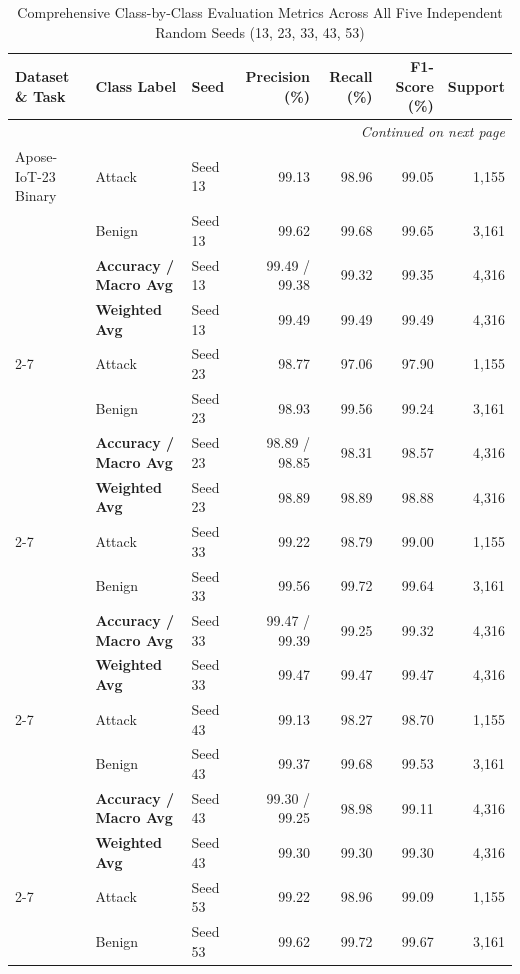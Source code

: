 \documentclass[a4paper,fleqn]{cas-sc}
\begin{document}
{\large
\begin{landscape}
\footnotesize
\begin{longtable}{lllrrrr}
\caption{Comprehensive Class-by-Class Evaluation Metrics Across All Five Independent Random Seeds (13, 23, 33, 43, 53)} 
\label{tab:supp_detailed_class_performance} \\
\toprule
\textbf{Dataset \& Task} & \textbf{Class Label} & \textbf{Seed} & \textbf{Precision} (\%) & \textbf{Recall} (\%) & \textbf{F1-Score} (\%) & \textbf{Support} \\
\midrule
\endhead
\midrule
\multicolumn{7}{r}{\textit{Continued on next page}} \\
\bottomrule
\endfoot
\bottomrule
\endlastfoot
Apose-IoT-23 Binary & Attack & Seed 13 & 99.13 & 98.96 & 99.05 & 1,155 \\
 & Benign & Seed 13 & 99.62 & 99.68 & 99.65 & 3,161 \\
 & \textbf{Accuracy / Macro Avg} & Seed 13 & 99.49 / 99.38 & 99.32 & 99.35 & 4,316 \\
 & \textbf{Weighted Avg} & Seed 13 & 99.49 & 99.49 & 99.49 & 4,316 \\
\cline{2-7}
 & Attack & Seed 23 & 98.77 & 97.06 & 97.90 & 1,155 \\
 & Benign & Seed 23 & 98.93 & 99.56 & 99.24 & 3,161 \\
 & \textbf{Accuracy / Macro Avg} & Seed 23 & 98.89 / 98.85 & 98.31 & 98.57 & 4,316 \\
 & \textbf{Weighted Avg} & Seed 23 & 98.89 & 98.89 & 98.88 & 4,316 \\
\cline{2-7}
 & Attack & Seed 33 & 99.22 & 98.79 & 99.00 & 1,155 \\
 & Benign & Seed 33 & 99.56 & 99.72 & 99.64 & 3,161 \\
 & \textbf{Accuracy / Macro Avg} & Seed 33 & 99.47 / 99.39 & 99.25 & 99.32 & 4,316 \\
 & \textbf{Weighted Avg} & Seed 33 & 99.47 & 99.47 & 99.47 & 4,316 \\
\cline{2-7}
 & Attack & Seed 43 & 99.13 & 98.27 & 98.70 & 1,155 \\
 & Benign & Seed 43 & 99.37 & 99.68 & 99.53 & 3,161 \\
 & \textbf{Accuracy / Macro Avg} & Seed 43 & 99.30 / 99.25 & 98.98 & 99.11 & 4,316 \\
 & \textbf{Weighted Avg} & Seed 43 & 99.30 & 99.30 & 99.30 & 4,316 \\
\cline{2-7}
 & Attack & Seed 53 & 99.22 & 98.96 & 99.09 & 1,155 \\
 & Benign & Seed 53 & 99.62 & 99.72 & 99.67 & 3,161 \\

\end{longtable}
\end{landscape}}
\end{document}
